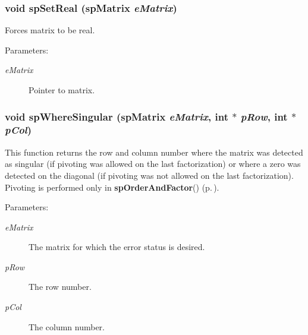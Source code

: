 \subsubsection{\setlength{\rightskip}{0pt plus 5cm}void sp\-Set\-Real ({\bf sp\-Matrix} {\em e\-Matrix})}\label{spAllocate_8c_a18}


Forces matrix to be real.\begin{Desc}
\item[Parameters: ]\par
\begin{description}
\item[{\em 
e\-Matrix}]Pointer to matrix. \end{description}
\end{Desc}
\subsubsection{\setlength{\rightskip}{0pt plus 5cm}void sp\-Where\-Singular ({\bf sp\-Matrix} {\em e\-Matrix}, int $\ast$ {\em p\-Row}, int $\ast$ {\em p\-Col})}\label{spAllocate_8c_a16}


This function returns the row and column number where the matrix was detected as singular (if pivoting was allowed on the last factorization) or where a zero was detected on the diagonal (if pivoting was not allowed on the last factorization). Pivoting is performed only in {\bf sp\-Order\-And\-Factor}() {\rm (p.\,\pageref{spFactor_8c_a24})}.\begin{Desc}
\item[Parameters: ]\par
\begin{description}
\item[{\em 
e\-Matrix}]The matrix for which the error status is desired. \item[{\em 
p\-Row}]The row number. \item[{\em 
p\-Col}]The column number. \end{description}
\end{Desc}
